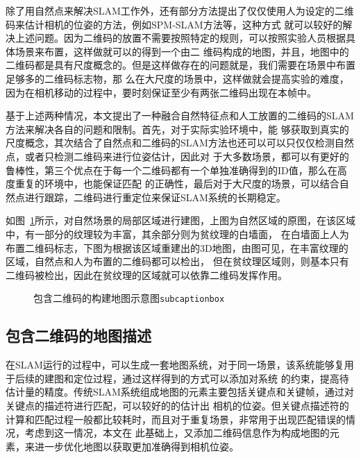 除了用自然点来解决SLAM工作外，还有部分方法提出了仅仅使用人为设定的二维码来估计相机的位姿的方法，例如SPM-SLAM方法等，这种方式
就可以较好的解决上述问题。因为二维码的放置不需要按照特定的规则，可以按照实验人员根据具体场景来布置，这样做就可以的得到一个由二
维码构成的地图，并且，地图中的二维码都是具有尺度概念的。但是这样做存在的问题就是，我们需要在场景中布置足够多的二维码标志物，那
么在大尺度的场景中，这样做就会提高实验的难度，因为在相机移动的过程中，要时刻保证至少有两张二维码出现在本帧中。

基于上述两种情况，本文提出了一种融合自然特征点和人工放置的二维码的SLAM方法来解决各自的问题和限制。首先，对于实际实验环境中，能
够获取到真实的尺度概念，其次结合了自然点和二维码的SLAM方法也还可以可以只仅仅检测自然点，或者只检测二维码来进行位姿估计，因此对
于大多数场景，都可以有更好的鲁棒性，第三个优点在于每一个二维码都有一个单独准确得到的ID值，那么在高度重复的环境中，也能保证匹配
的正确性，最后对于大尺度的场景，可以结合自然点进行跟踪，二维码进行重定位来保证SLAM系统的长期稳定。

如图~\ref{fig:map}所示，对自然场景的局部区域进行建图，上图为自然区域的原图，在该区域中，有一部分的纹理较为丰富，其余部分则为贫纹理的白墙面，
在白墙面上人为布置二维码标志，下图为根据该区域重建出的3D地图，由图可见，在丰富纹理的区域，自然点和人为布置的二维码都可以检出，
但在贫纹理区域则，则基本只有二维码被检出，因此在贫纹理的区域就可以依靠二维码发挥作用。

\begin{figure}[htbp]
  \centering
  \vskip0.5cm
  \caption{包含二维码的构建地图示意图\texttt{subcaptionbox}}\label{fig:map}
  \end{figure}

\subsection{包含二维码的地图描述}
\label{sec:2.3.2}
在SLAM运行的过程中，可以生成一套地图系统，对于同一场景，该系统能够复用于后续的建图和定位过程，通过这样得到的方式可以添加对系统
的约束，提高待估计量的精度。传统SLAM系统组成地图的元素主要包括关键点和关键帧，通过对关键点的描述符进行匹配，可以较好的的估计出
相机的位姿。但关键点描述符的计算和匹配过程一般都比较耗时，而且对于重复场景，非常用于出现匹配错误的情况，考虑到这一情况，本文在
此基础上，又添加二维码信息作为构成地图的元素，来进一步优化地图以获取更加准确得到相机位姿。

